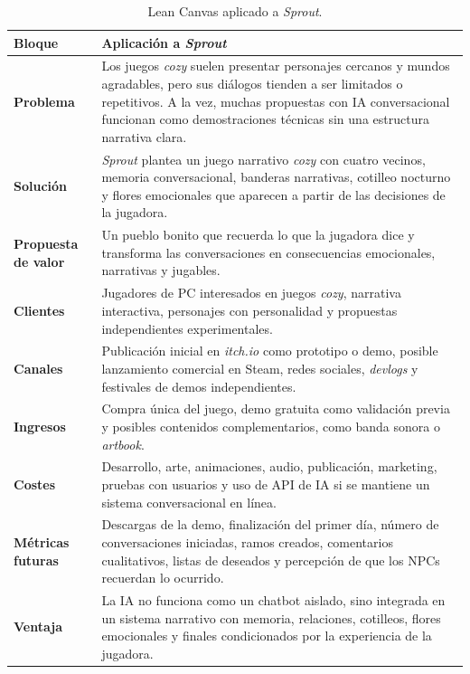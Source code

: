 \documentclass[12pt,twoside,titlepage]{report}
\begin{document}
\begin{table}[h]
\centering
\caption{Lean Canvas aplicado a \textit{Sprout}.}
\label{tab:lean_canvas_sprout}
\begin{footnotesize}
\renewcommand{\arraystretch}{1.35}
\begin{tabular}{|p{}|p{}|}
\hline
\textbf{Bloque} & \textbf{Aplicación a \textit{Sprout}} \\
\hline

\textbf{Problema} &
Los juegos \textit{cozy} suelen presentar personajes cercanos y mundos agradables, pero sus diálogos tienden a ser limitados o repetitivos. A la vez, muchas propuestas con IA conversacional funcionan como demostraciones técnicas sin una estructura narrativa clara. \\
\hline

\textbf{Solución} &
\textit{Sprout} plantea un juego narrativo \textit{cozy} con cuatro vecinos, memoria conversacional, banderas narrativas, cotilleo nocturno y flores emocionales que aparecen a partir de las decisiones de la jugadora. \\
\hline

\textbf{Propuesta de valor} &
Un pueblo bonito que recuerda lo que la jugadora dice y transforma las conversaciones en consecuencias emocionales, narrativas y jugables. \\
\hline

\textbf{Clientes} &
Jugadores de PC interesados en juegos \textit{cozy}, narrativa interactiva, personajes con personalidad y propuestas independientes experimentales. \\
\hline

\textbf{Canales} &
Publicación inicial en \textit{itch.io} como prototipo o demo, posible lanzamiento comercial en Steam, redes sociales, \textit{devlogs} y festivales de demos independientes. \\
\hline

\textbf{Ingresos} &
Compra única del juego, demo gratuita como validación previa y posibles contenidos complementarios, como banda sonora o \textit{artbook}. \\
\hline

\textbf{Costes} &
Desarrollo, arte, animaciones, audio, publicación, marketing, pruebas con usuarios y uso de API de IA si se mantiene un sistema conversacional en línea. \\
\hline

\textbf{Métricas futuras} &
Descargas de la demo, finalización del primer día, número de conversaciones iniciadas, ramos creados, comentarios cualitativos, listas de deseados y percepción de que los NPCs recuerdan lo ocurrido. \\
\hline

\textbf{Ventaja} &
La IA no funciona como un chatbot aislado, sino integrada en un sistema narrativo con memoria, relaciones, cotilleos, flores emocionales y finales condicionados por la experiencia de la jugadora. \\
\hline

\end{tabular}
\end{footnotesize}
\end{table}
\end{document}
